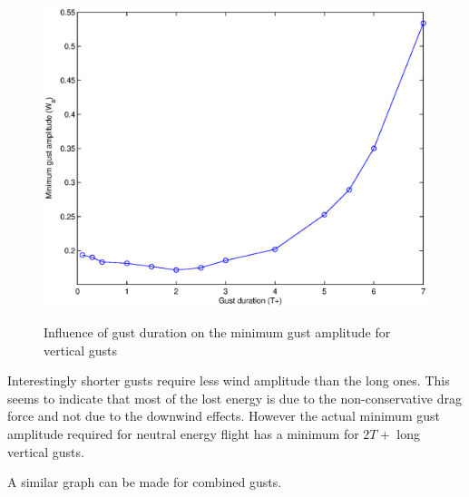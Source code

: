     \begin{figure}[h!]
      \begin{center}
	\scalebox{0.8}
	{\includegraphics{./Figures/Vertical_gust_amplitude_vs_duration.eps}}
      \end{center}
      \caption{Influence of gust duration on the minimum gust amplitude for vertical gusts}
      \label{fig:vertical_amplitude_duration}
    \end{figure}

    \FloatBarrier

    \par Interestingly shorter gusts require less wind amplitude than the long ones.
    This seems to indicate that most of the lost energy is due to the non-conservative drag force and not due to the downwind effects.
    However the actual minimum gust amplitude required for neutral energy flight has a minimum for $2T+$ long vertical gusts.

    \par A similar graph can be made for combined gusts.

